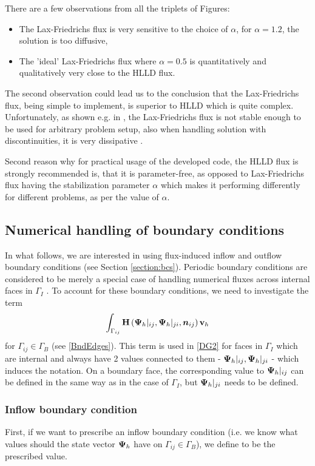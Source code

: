 There are a few observations from all the triplets of Figures:
\begin{itemize}
\item The Lax-Friedrichs flux is very sensitive to the choice of $\alpha$, for $\alpha = 1.2$, the solution is too diffusive,
\item The 'ideal' Lax-Friedrichs flux where $\alpha = 0.5$ is quantitatively and qualitatively very close to the HLLD flux.
\end{itemize}
The second observation could lead us to the conclusion that the Lax-Friedrichs flux, being simple to implement, is superior to HLLD which is quite complex. Unfortunately, as shown e.g. in \cite{lfunstable}, the Lax-Friedrichs flux is not stable enough to be used for arbitrary problem setup, also when handling solution with discontinuities, it is very dissipative \cite{lfdisc}.

Second reason why for practical usage of the developed code, the HLLD flux is strongly recommended is, that it is parameter-free, as opposed to Lax-Friedrichs flux having the stabilization parameter $\alpha$ which makes it performing differently for different problems, as per the value of $\alpha$.

\subsection{Numerical handling of boundary conditions}
In what follows, we are interested in using flux-induced inflow and outflow boundary conditions (see Section \cref{section:bcs}). Periodic boundary conditions are considered to be merely a special case of handling numerical fluxes across internal faces in $\Gamma_I$ .
To account for these boundary conditions, we need to investigate the term
$$
\int_{\Gamma_{ij}} \mathrm{\mathbf{H}}\left({\mathrm{\mathbf{\Psi}}_h}|_{ij}, {\mathrm{\mathbf{\Psi}}_h}|_{ji}, \mbox{\boldmath $n$}_{ij}\right) \mathrm{\mathbf{v}}_h
$$
for $\Gamma_{ij} \in \Gamma_B$ (see \cref{BndEdges}).
This term is used in \cref{DG2} for faces in $\Gamma_I$ which are internal and always have 2 values connected to them - $\mathrm{\mathbf{\Psi}}_h|_{ij}, {\mathrm{\mathbf{\Psi}}_h}|_{ji}$ - which induces the notation. On a boundary face, the corresponding value to ${\mathrm{\mathbf{\Psi}}_h}|_{ij}$ can be defined in the same way as in the case of $\Gamma_I$, but ${\mathrm{\mathbf{\Psi}}_h}|_{ji}$ needs to be defined.
\subsubsection{Inflow boundary condition}
First, if we want to prescribe an inflow boundary condition (i.e. we know what values should the state vector $\mathrm{\mathbf{\Psi}}_h$ have on ${\Gamma_{ij}}\in\Gamma_B$), we define
\be
\label{BC1} 
\ee
to be the prescribed value.

